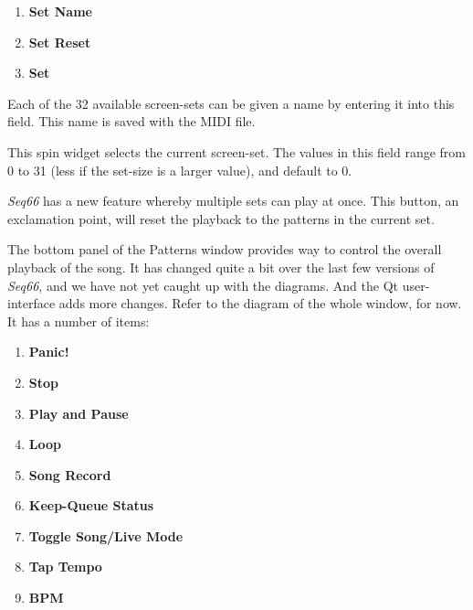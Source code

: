    \begin{enumerate}
      \item \textbf{Set Name}
      \item \textbf{Set Reset}
      \item \textbf{Set}
   \end{enumerate}

   \setcounter{ItemCounter}{0}      %

   Each of the 32 available screen-sets can be given a name by entering it
   into this field.  This name is saved with the MIDI file.

   This spin widget selects the current screen-set.  The values in this
   field range from 0 to 31 (less if the set-size is a larger value),
   and default to 0.

   \textsl{Seq66} has a new feature whereby multiple sets can play at once.
   This button, an exclamation point, will reset the playback to the patterns
   in the current set.

   The bottom panel of the Patterns window provides way to control the
   overall playback of the song.  It has changed quite a bit over the last few
   versions of \textsl{Seq66}, and we have not yet caught up with the
   diagrams. And the Qt user-interface adds more changes.
   Refer to the diagram of the whole window, for now.
   It has a number of items:

   \begin{enumerate}
      \item \textbf{Panic!}
      \item \textbf{Stop}
      \item \textbf{Play and Pause}
      \item \textbf{Loop}
      \item \textbf{Song Record}
      \item \textbf{Keep-Queue Status}
      \item \textbf{Toggle Song/Live Mode}
      \item \textbf{Tap Tempo}
      \item \textbf{BPM}
   \end{enumerate}

